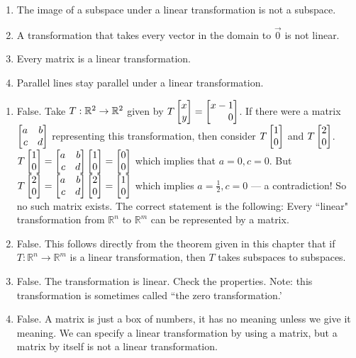 \begin{exercises}
\begin{problist}
\begin{enumerate}
			\item The image of a subspace under a linear transformation is not a
				subspace.

			\item A transformation that takes every vector in the domain to
				$\vec 0$ is not linear.

			\item Every matrix is a linear transformation.

			\item Parallel lines stay parallel under a linear transformation.
		\end{enumerate}
		\begin{solution}
			\begin{enumerate}
				\item False. Take $T : \mathbb{R}^{2}\rightarrow \mathbb{R}^{2}$ given by $T
					\mat{x\\y}= \mat{x-1\\0}$. If there were a matrix
					$\mat{a & b \\ c& d}$ representing this transformation, then
					consider $T\mat{1\\0}$ and $T\mat{2\\0}$.
					$T\mat{1\\0}=\mat{a & b \\ c& d}\mat{1\\0}=\mat{0\\0}$ which
					implies that $a=0, c=0$. But $T\mat{2\\0}=\mat
					{a & b \\ c& d}\mat{2\\0}= \mat{1\\0}$ which implies $a=
					\tfrac{1}{2},c=0$ --- a contradiction! So no such matrix
					exists. The correct statement is the following: Every
					``linear" transformation from $\mathbb{R}^{n}$ to
					$\mathbb{R}^{m}$ can be represented by a matrix.

				\item False. This follows directly from the theorem given in this
					chapter that if $T : \mathbb{R}^{n}\rightarrow \mathbb{R}
					^{m}$ is a linear transformation, then $T$ takes subspaces
					to subspaces.

				\item False. The transformation is linear. Check the properties.
					Note: this transformation is sometimes called ``the zero
					transformation.'

				\item False. A matrix is just a box of numbers, it has no
					meaning unless we give it meaning. We can specify a linear transformation
					by using a matrix, but a matrix by itself is not a linear
					transformation.


\end{enumerate}
\end{solution}
\end{problist}
\end{exercises}
